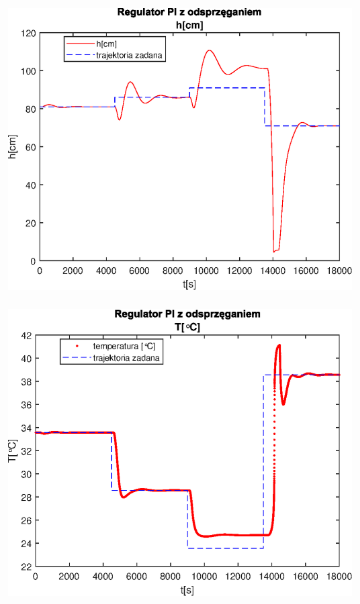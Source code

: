 \begin{figure}[h!]
   \centering
   \begin{subfigure}[b]{0.4\textwidth}
      \includegraphics[width=1\linewidth]{img/PI/decoupler/noDisturbance/PIDecouplerH1Linfalse.eps}
      \caption{}
      \label{fig:fig:PIDecoupler1Linfalse1}
   \end{subfigure}
       
   \begin{subfigure}[b]{0.4\textwidth}
      \includegraphics[width=1\linewidth]{img/PI/decoupler/noDisturbance/PIDecouplerT1Linfalse.eps}
      \caption{}
      \label{fig:fig:PIDecoupler1Linfalse2}
   \end{subfigure}
       

\end{figure}
